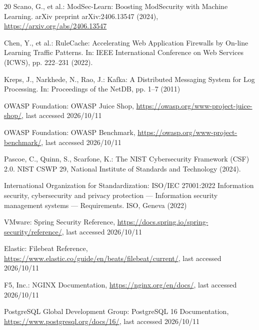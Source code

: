 \documentclass[runningheads]{report-template/llncs}
\begin{document}
\begin{thebibliography}{20}
Scano, G., et al.: ModSec-Learn: Boosting ModSecurity with Machine
Learning. arXiv preprint arXiv:2406.13547 (2024),
\url{https://arxiv.org/abs/2406.13547}

Chen, Y., et al.: RuleCache: Accelerating Web Application Firewalls by
On-line Learning Traffic Patterns. In: IEEE International Conference on
Web Services (ICWS), pp. 222--231 (2022).

Kreps, J., Narkhede, N., Rao, J.: Kafka: A Distributed Messaging System
for Log Processing. In: Proceedings of the NetDB, pp. 1--7 (2011)

OWASP Foundation: OWASP Juice Shop,
\url{https://owasp.org/www-project-juice-shop/}, last accessed 2026/10/11

OWASP Foundation: OWASP Benchmark,
\url{https://owasp.org/www-project-benchmark/}, last accessed 2026/10/11

Pascoe, C., Quinn, S., Scarfone, K.: The NIST Cybersecurity Framework
(CSF) 2.0. NIST CSWP 29, National Institute of Standards and Technology
(2024). 

International Organization for Standardization: ISO/IEC 27001:2022
Information security, cybersecurity and privacy protection ---
Information security management systems --- Requirements. ISO, Geneva
(2022)

VMware: Spring Security Reference,
\url{https://docs.spring.io/spring-security/reference/}, last accessed
2026/10/11

Elastic: Filebeat Reference,
\url{https://www.elastic.co/guide/en/beats/filebeat/current/}, last
accessed 2026/10/11

F5, Inc.: NGINX Documentation,
\url{https://nginx.org/en/docs/}, last accessed 2026/10/11

PostgreSQL Global Development Group: PostgreSQL 16 Documentation,
\url{https://www.postgresql.org/docs/16/}, last accessed 2026/10/11

\end{thebibliography}
\end{document}

